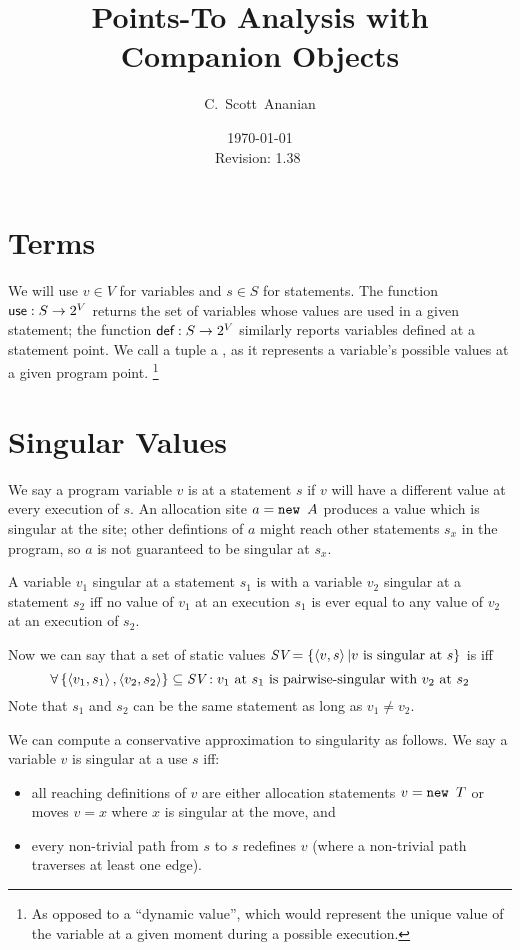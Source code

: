 \documentclass[11pt,notitlepage]{article}
\author{C.~Scott~Ananian}
\title{Points-To Analysis with Companion Objects}
\date{\today \\ $ $Revision: 1.38 $ $}
\newcommand{\bigvar}[1]{\ensuremath{\text{\it #1}}}
\newcommand{\func}[1]{\ensuremath{\text{\sffamily #1}}}
\begin{document}

\maketitle
\section{Terms} %
We will use $v\in V$ for variables and $s\in S$ for statements.  The
function $\func{use}:S\to 2^V$ returns the set of variables whose
values are used in a given statement; the function $\func{def}:S\to
2^V$ similarly reports variables defined at a statement point.
We call a tuple  a , as it represents
a variable's possible values at a given program point.%
\footnote{As opposed to a ``dynamic value'', which would represent the
  unique value of the variable at a given moment during a possible execution.}

\section{Singular Values}

We say a program variable $v$ is  at a statement $s$
if $v$ will have a different value at every execution of $s$.  An
allocation site $a = \text{\tt new }A$ produces a value which is singular
at the site; other defintions of $a$ might reach other statements
$s_x$ in the program, so $a$ is not guaranteed to be singular at $s_x$.

A variable $v_1$ singular at a statement $s_1$ is
 with a variable $v_2$ singular at a statement
$s_2$ iff no value of $v_1$ at an execution $s_1$ is ever equal to any
value of $v_2$ at an execution of $s_2$.

Now we can say that a set of static values
$\bigvar{SV}=\left\{ \tuple{v,s} | v \text{ is singular at } s \right\}$
is
 iff
\begin{displaymath}
\forall \left\{ \tuple{v_1,s_1}, \tuple{v_2,s_2} \right\} \subseteq
        \bigvar{SV} :
v_1 \text{ at } s_1 \text{ is pairwise-singular with } v_2 \text{ at } s_2
\end{displaymath}
Note that $s_1$ and $s_2$ can be the same statement as long as $v_1\neq v_2$.

We can compute a conservative approximation to singularity as follows.
We say a variable $v$ is singular at a use $s$ iff:
\begin{itemize}
\item all reaching definitions of $v$ are either allocation statements 
$v = \text{\tt new }T$ or moves $v = x$ where $x$ is singular at
the move, and
\item every non-trivial path from $s$ to $s$ redefines $v$ (where a
  non-trivial path traverses at least one edge).
\end{itemize}
\end{document}
